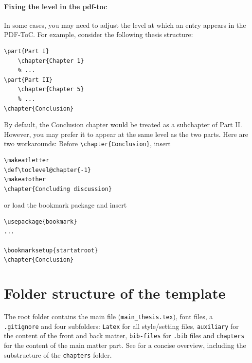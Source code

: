 \paragraph{Fixing the level in the pdf-toc}
In some cases, you may need to adjust the level at which an entry appears in the PDF-ToC. For example, consider the following thesis structure:
\begin{lstlisting}
\part{Part I}
	\chapter{Chapter 1}
	% ... 
\part{Part II}
	\chapter{Chapter 5}
	% ...
\chapter{Conclusion}
\end{lstlisting}
By default, the Conclusion chapter would be treated as a subchapter of Part II. However, you may prefer it to appear at the same level as the two parts. Here are two workarounds:
Before \verb|\chapter{Conclusion}|, insert
\begin{lstlisting}
\makeatletter
\def\toclevel@chapter{-1}
\makeatother
\chapter{Concluding discussion}
\end{lstlisting}
or load the bookmark package and insert
\begin{lstlisting}
\usepackage{bookmark}
...

\bookmarksetup{startatroot}
\chapter{Conclusion}
\end{lstlisting}


\section{Folder structure of the template}
The root folder contains the main file (\verb|main_thesis.tex|), font files, a \verb|.gitignore| and four subfolders: \verb|Latex| for all style/setting files, \verb|auxiliary| for the content of the front and back matter, \verb|bib-files| for \verb|.bib| files and \verb|chapters| for the content of the main matter part.
See  for a concise overview, including the substructure of the \verb|chapters| folder.

